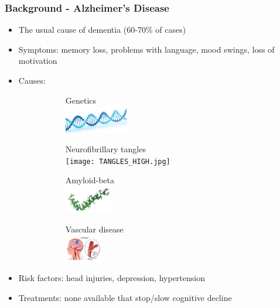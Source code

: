 \documentclass[10pt,xcolor=table]{beamer}
\begin{document}
\begin{frame}
\frametitle{Background - Alzheimer's Disease}

\small{
\begin{itemize}
 \item The usual cause of dementia (60-70\% of cases)
 \item Symptoms: memory loss, problems with language, mood swings, loss of motivation
 \item Causes:
 
 \vspace{-1em}
\begin{figure}
\centering
\begin{subfigure}{0.3\textwidth}
\centering
Genetics\\
\includegraphics[height=1.2cm]{DNA.jpg}
\end{subfigure}
\begin{subfigure}{0.3\textwidth}
\centering
Neurofibrillary tangles\\
\texttt{[image: TANGLES\_HIGH.jpg]}
\end{subfigure}

\begin{subfigure}{0.3\textwidth}
\centering
\vspace{1em}
Amyloid-beta\\
\includegraphics[height=1.2cm]{amyloid_beta.png}
\end{subfigure}
\begin{subfigure}{0.3\textwidth}
\centering
\vspace{1em}
Vascular disease\\
\includegraphics[height=1.2cm]{vascular_disease.jpg}
\end{subfigure}

\end{figure}

 \item Risk factors: head injuries, depression, hypertension
 \item Treatments: none available that stop/slow cognitive decline
 
\end{itemize}


}
\vspace{-1em}

\end{frame}
\end{document}
